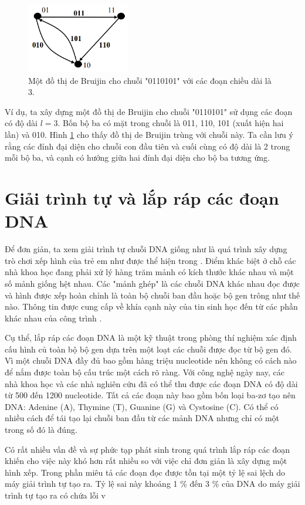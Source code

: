 \documentclass[14pt, a4paper]{article}
\numberwithin{equation}{section}
\numberwithin{figure}{section}
\numberwithin{dl}{section}
\numberwithin{md}{section}
\numberwithin{bd}{section}
\numberwithin{dn}{section}
\numberwithin{hq}{section}
\begin{document}
    \begin{figure}[h!]
        \centering
        \includegraphics[width=0.4\textwidth]{1.png}
        \caption{Một đồ thị de Bruijin cho chuỗi "0110101" với các đoạn chiều dài là 3.}
        \label{fig:1}
    \end{figure}

    Ví dụ, ta xây dựng một đồ thị de Bruijin cho chuỗi "0110101" sử dụng các đoạn có độ dài $l=3$.
    Bốn bộ ba có mặt trong chuỗi là 011, 110, 101 (xuất hiện hai lần) và 010.
    Hình \ref{fig:1} cho thấy đồ thị de Bruijin trùng với chuỗi này.
    Ta cần lưu ý rằng các đỉnh đại diện cho chuỗi con đầu tiên và cuối cùng có độ dài là 2 trong mỗi bộ ba, và cạnh có hướng giữa hai đỉnh đại diện cho bộ ba tương ứng.

    \section{Giải trình tự và lắp ráp các đoạn DNA}

    Để đơn giản, ta xem giải trình tự chuỗi DNA giống như là quá trình xây dựng trò chơi xếp hình của trẻ em như được thể hiện trong \cite{pevzner2001eulerian}.
    Điểm khác biệt ở chỗ các nhà khoa học đang phải xử lý hàng trăm mảnh có kích thước khác nhau và một số mảnh giống hệt nhau.
    Các "mảnh ghép" là các chuỗi DNA khác nhau đọc được và hình được xếp hoàn chỉnh là toàn bộ chuỗi ban đầu hoặc bộ gen trông như thế nào.
    Thông tin được cung cấp về khía cạnh này của tin sinh học đến từ các phần khác nhau của công trình \cite{jones2004introduction}.

    Cụ thể, lắp ráp các đoạn DNA là một kỹ thuật trong phòng thí nghiệm xác định cấu hình củ toàn bộ bộ gen dựa trên một loạt các chuỗi được đọc từ bộ gen đó.
    Vì một chuỗi DNA đầy đủ bao gồm hàng triệu nucleotide nên không có cách nào để nắm được toàn bộ cấu trúc một cách rõ ràng.
    Với công nghệ ngày nay, các nhà khoa học và các nhà nghiên cứu đã có thể thu được các đoạn DNA có độ dài từ 500 đến 1200 nucleotide.
    Tất cả các đoạn này bao gồm bốn loại ba-zơ tạo nên DNA: Adenine (A), Thymine (T), Guanine (G) và Cystosine (C).
    Có thể có nhiều cách để tái tạo lại chuỗi ban đầu từ các mảnh DNA nhưng chỉ có một trong số đó là đúng.

    Có rất nhiều vấn đề và sự phức tạp phát sinh trong quá trình lắp ráp các đoạn khiến cho việc này khó hơn rất nhiều so với việc chỉ đơn giản là xây dựng một hình xếp.
    Trong phần miêu tả các đoạn đọc được tồn tại một tỷ lệ sai lệch do máy giải trình tự tạo ra.
    Tỷ lệ sai này khoảng 1 \% đến 3 \% của DNA do máy giải trình tự tạo ra có chứa lỗi v

    \newpage
    \printbibliography[title={TÀI LIỆU THAM KHẢO}]
\end{document}
